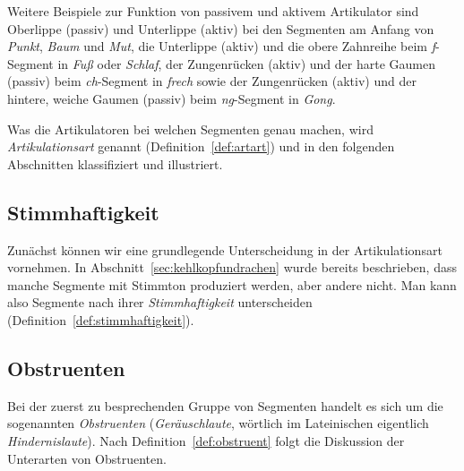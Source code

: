 Weitere Beispiele zur Funktion von passivem und aktivem Artikulator sind Oberlippe (passiv) und Unterlippe (aktiv) bei den Segmenten am Anfang von \textit{Punkt}, \textit{Baum} und \textit{Mut}, die Unterlippe (aktiv) und die obere Zahnreihe beim \textit{f}-Segment in \textit{Fuß} oder \textit{Schlaf}, der Zungenrücken (aktiv) und der harte Gaumen (passiv) beim \textit{ch}-Segment in \textit{frech} sowie der Zungenrücken (aktiv) und der hintere, weiche Gaumen (passiv) beim \textit{ng}-Segment in \textit{Gong}.

Was die Artikulatoren bei welchen Segmenten genau machen, wird \textit{Artikulationsart} genannt (Definition~\ref{def:artart}) und in den folgenden Abschnitten klassifiziert und illustriert.


\subsection{Stimmhaftigkeit}
\label{sec:stimmhaftigkeit}

Zunächst können wir eine grundlegende Unterscheidung in der Artikulationsart vornehmen.
In Abschnitt~\ref{sec:kehlkopfundrachen} wurde bereits beschrieben, dass manche Segmente mit Stimmton produziert werden, aber andere nicht.
Man kann also Segmente nach ihrer \textit{Stimmhaftigkeit} unterscheiden (Definition~\ref{def:stimmhaftigkeit}).


\subsection{Obstruenten}
\label{sec:obstruenten}

Bei der zuerst zu besprechenden Gruppe von Segmenten handelt es sich um die sogenannten \textit{Obstruenten} (\textit{Geräuschlaute}, wörtlich im Lateinischen eigentlich \textit{Hindernislaute}).
Nach Definition~\ref{def:obstruent} folgt die Diskussion der Unterarten von Obstruenten.


